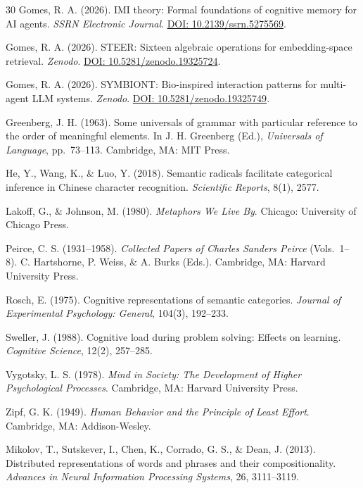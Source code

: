 \documentclass[12pt,a4paper]{article}
\begin{document}
\begin{thebibliography}{30}
Gomes, R. A. (2026).
IMI theory: Formal foundations of cognitive memory for AI agents.
\textit{SSRN Electronic Journal}. \href{https://doi.org/10.2139/ssrn.5275569}{DOI: 10.2139/ssrn.5275569}.

Gomes, R. A. (2026).
STEER: Sixteen algebraic operations for embedding-space retrieval.
\textit{Zenodo}. \href{https://doi.org/10.5281/zenodo.19325724}{DOI: 10.5281/zenodo.19325724}.

Gomes, R. A. (2026).
SYMBIONT: Bio-inspired interaction patterns for multi-agent LLM systems.
\textit{Zenodo}. \href{https://doi.org/10.5281/zenodo.19325749}{DOI: 10.5281/zenodo.19325749}.

Greenberg, J. H. (1963).
Some universals of grammar with particular reference to the order of meaningful elements.
In J. H. Greenberg (Ed.), \textit{Universals of Language}, pp.\ 73--113.
Cambridge, MA: MIT Press.

He, Y., Wang, K., \& Luo, Y. (2018).
Semantic radicals facilitate categorical inference in Chinese character recognition.
\textit{Scientific Reports}, 8(1), 2577.

Lakoff, G., \& Johnson, M. (1980).
\textit{Metaphors We Live By}.
Chicago: University of Chicago Press.

Peirce, C. S. (1931--1958).
\textit{Collected Papers of Charles Sanders Peirce} (Vols.\ 1--8).
C. Hartshorne, P. Weiss, \& A. Burks (Eds.).
Cambridge, MA: Harvard University Press.

Rosch, E. (1975).
Cognitive representations of semantic categories.
\textit{Journal of Experimental Psychology: General}, 104(3), 192--233.

Sweller, J. (1988).
Cognitive load during problem solving: Effects on learning.
\textit{Cognitive Science}, 12(2), 257--285.

Vygotsky, L. S. (1978).
\textit{Mind in Society: The Development of Higher Psychological Processes}.
Cambridge, MA: Harvard University Press.

Zipf, G. K. (1949).
\textit{Human Behavior and the Principle of Least Effort}.
Cambridge, MA: Addison-Wesley.

Mikolov, T., Sutskever, I., Chen, K., Corrado, G. S., \& Dean, J. (2013).
Distributed representations of words and phrases and their compositionality.
\textit{Advances in Neural Information Processing Systems}, 26, 3111--3119.


\end{thebibliography}
\end{document}

